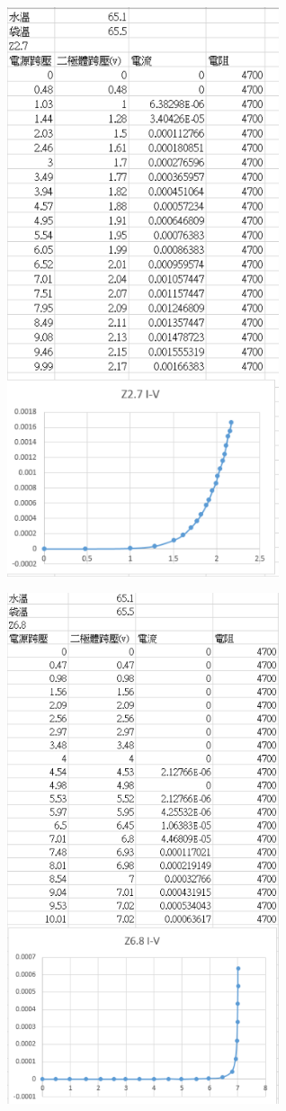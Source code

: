 \documentclass[UTF8]{ctexart}
\begin{document}
\begin{CJK*}{UTF8}{song}
\begin{minipage}[t]{0.48\textwidth}
\centering
\includegraphics[width = 0.6\textwidth]{65z27.png}
\end{minipage}
\begin{minipage}[t]{0.48\textwidth}
\centering
\includegraphics[width = 0.6\textwidth]{65z68.png}
\end{minipage}
\newpage


\end{CJK*}
\end{document}
